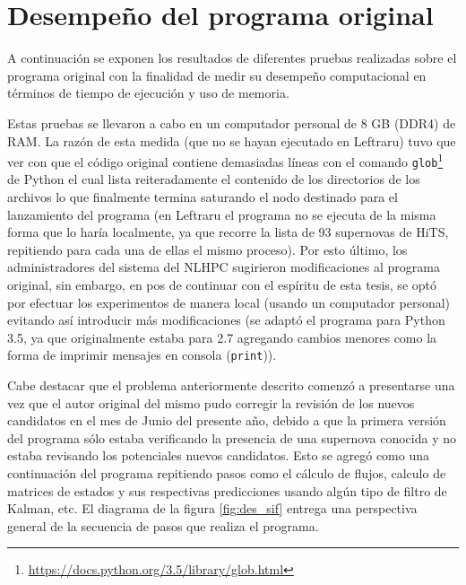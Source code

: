\chapter{Desempe\~no del programa original}
\label{ch:prev_work}

A continuaci\'on se exponen los resultados de diferentes pruebas realizadas sobre el programa original con la finalidad de medir su desempe\~no computacional en t\'erminos de tiempo de ejecuci\'on y uso de memoria.
\bigskip

Estas pruebas se llevaron a cabo en un computador personal de 8 GB (DDR4) de RAM. La raz\'on de esta  medida (que no se hayan ejecutado en Leftraru) tuvo que ver con que el c\'odigo original contiene demasiadas l\'ineas con el comando \texttt{glob}\footnote{\url{https://docs.python.org/3.5/library/glob.html}} de Python el cual lista reiteradamente el contenido de los directorios de los archivos lo que finalmente termina saturando el nodo destinado para el lanzamiento del programa (en Leftraru el programa no se ejecuta de la misma forma que lo har\'ia localmente, ya que recorre la lista de 93 supernovas de HiTS, repitiendo para cada una de ellas el mismo proceso). Por esto \'ultimo, los administradores del sistema del NLHPC sugirieron modificaciones al programa original, sin embargo, en pos de continuar con el esp\'iritu de esta tesis, se opt\'o por efectuar los experimentos de manera local (usando un computador personal) evitando as\'i introducir m\'as modificaciones (se adapt\'o el programa para Python 3.5, ya que originalmente estaba para 2.7 agregando cambios menores como la forma de imprimir mensajes en consola (\texttt{print})).
\bigskip


Cabe destacar que el problema anteriormente descrito comenz\'o a presentarse una vez que el autor original del mismo pudo corregir la revisi\'on de los nuevos candidatos en el mes de Junio del presente a\~no, debido a que la primera versi\'on del programa s\'olo estaba verificando la presencia de una supernova conocida y no estaba revisando los potenciales nuevos candidatos. Esto se agreg\'o como una continuaci\'on del programa repitiendo pasos como el c\'alculo de flujos, calculo de matrices de estados y sus respectivas predicciones usando alg\'un tipo de filtro de Kalman, etc. El diagrama de la figura \ref{fig:des_sif} entrega una perspectiva general de la secuencia de pasos que realiza el programa.
\bigskip

